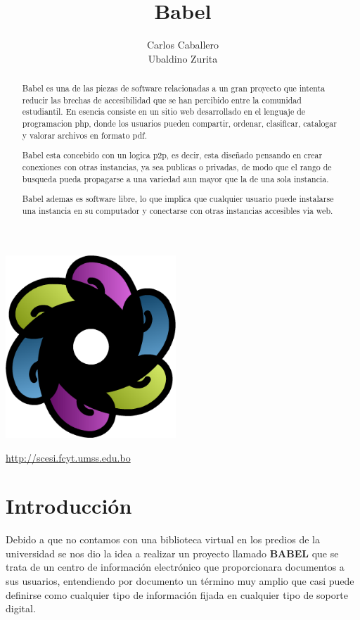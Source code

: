 \documentclass[letter,12pt]{article}
\title{\bf Babel}
\author{Carlos Caballero\\Ubaldino Zurita}
\begin{document}
\maketitle
\begin{center}\includegraphics[width=0.48\textwidth]{img/babel.png}\end{center}
\begin{center}\url {http://scesi.fcyt.umss.edu.bo}\end{center}
\pagebreak

\tableofcontents
\pagebreak

\begin{abstract}
Babel es una de las piezas de software relacionadas a un gran proyecto que
intenta reducir las brechas de accesibilidad que se han percibido entre la
comunidad estudiantil. En esencia consiste en un sitio web desarrollado en
el lenguaje de programacion php, donde los usuarios pueden compartir, ordenar,
clasificar, catalogar y valorar archivos en formato pdf.

Babel esta concebido con un logica p2p, es decir, esta diseñado pensando en
crear conexiones con otras instancias, ya sea publicas o privadas, de modo
que el rango de busqueda pueda propagarse a una variedad aun mayor que la de
una sola instancia.

Babel ademas es software libre, lo que implica que cualquier usuario puede
instalarse una instancia en su computador y conectarse con otras instancias
accesibles via web.
\end{abstract}
\pagebreak

\section{Introducción}
Debido a que no contamos con una biblioteca virtual en los predios de la universidad se nos dio la idea a realizar un
proyecto llamado {\bf BABEL} que se trata de un centro de información electrónico que proporcionara documentos a sus
usuarios, entendiendo por documento un término muy amplio que casi puede definirse como cualquier tipo de información
fijada en cualquier tipo de soporte digital.
\end{document}
